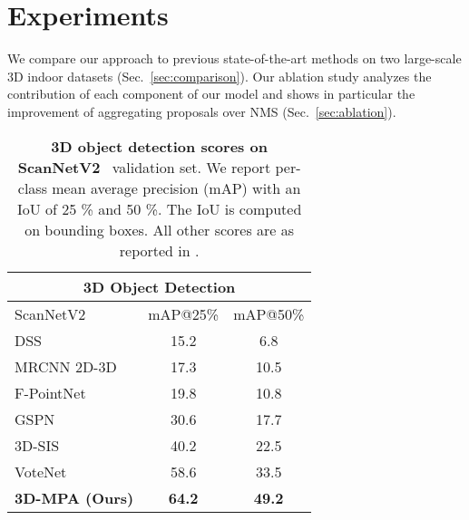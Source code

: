 \documentclass[10pt,twocolumn,letterpaper]{article}
\newcommand{\refsec}[1]{Sec.~\ref{sec:#1}}
\newcommand{\name}{3D-MPA}
\begin{document}
\section{Experiments}
\label{sec:results}
\vspace{-5px}
We compare our approach to previous state-of-the-art methods on two large-scale 3D indoor datasets (\refsec{comparison}). 
Our ablation study analyzes the contribution of each component of our model and shows in particular the improvement of aggregating proposals over NMS (\refsec{ablation}). 



\begin{table}
\center
    \begin{tabular}{l c c}
        \toprule
        \multicolumn{3}{c}{\textbf{3D Object Detection}}  \\ 
            \midrule
         ScanNetV2 \hspace{2cm}     & mAP@25\% & mAP@50\%  \\
         \midrule
         DSS~\cite{Song16CVPR}      & 15.2  & 6.8  \\
         MRCNN 2D-3D~\cite{He17ICCV}& 17.3  & 10.5 \\
         F-PointNet~\cite{Qi18CVPR} & 19.8  & 10.8 \\
         GSPN~\cite{Li19CVPR}       & 30.6  & 17.7 \\
         3D-SIS~\cite{Hou19CVPR}    & 40.2  & 22.5 \\
         VoteNet~\cite{Qi19ICCV}    & 58.6  & 33.5 \\
         \textbf{\name{} (Ours)}    & \textbf{64.2} & \textbf{49.2}\\
         \bottomrule
    \end{tabular}
    \vspace{-5px}
    \caption{\textbf{3D object detection scores on ScanNetV2}~\cite{Dai17CVPR} validation set.
    We report per-class mean average precision (mAP) with an IoU of 25 \% and 50 \%. The IoU is computed on bounding boxes.
    All other scores are as reported in \cite{Qi19ICCV}.}
    \label{tab:object_detection_scannet}
\end{table} 
\end{document}
